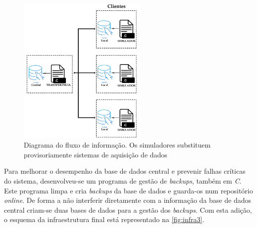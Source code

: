 \documentclass[11pt,twoside,a4paper]{report}
\begin{document}
\begin{figure}[H]
	\begin{center}
		\includegraphics[width=0.55\textwidth]{Esquema_Projeto_5} %
		\caption[Diagrama do fluxo de informação]{Diagrama do fluxo de informação. Os simuladores substituem provisoriamente sistemas de aquisição de dados}
		\label{fig:infra2}
		\end{center}
\end{figure}
Para melhorar o desempenho da base de dados central e prevenir falhas críticas do sistema, desenvolveu-se um programa de gestão de \textit{backups}, também em \textit{C}. Este programa limpa e cria \textit{backups} da base de dados e guarda-os num repositório \textit{online}. De forma a não interferir diretamente com a informação da base de dados central criam-se duas bases de dados para a gestão dos \textit{backups}. Com esta adição, o esquema da infraestrutura final está representado na \autoref{fig:infra3}.
\end{document}
